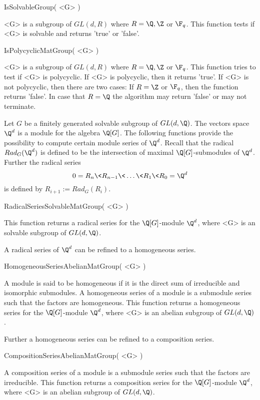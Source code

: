 \> IsSolvableGroup( <G> )

<G> is  a subgroup of $GL(d,R)$ where $R=\Q,\Z $ or $\F_q$.
This function tests if <G> is
solvable and returns 'true' or 'false'. 

\> IsPolycyclicMatGroup( <G> )

<G> is  a subgroup of $GL(d,R)$ where $R=\Q,\Z $ or $\F_q$.
 This function tries to test if <G> is polycyclic. If <G> is polycyclic,
 then it returns 'true'. 
If <G> is not polycyclic, then there are two cases: If $R=\Z$ or $\F_q$,
then the function returns 'false'. In case that $R=\Q$ the algorithm may
return 'false' or may not terminate.
 

Let $G$ be a finitely generated solvable subgroup of $GL(d,\Q)$. The vectors
space $\Q^d$ is a module for the algebra $\Q[G]$. The following
functions provide the possibility to compute certain module series of
$\Q^d$. Recall that the radical $Rad_G(\Q^d)$ is defined to be the
intersection of maximal $\Q[G]$-submodules of $\Q^d$. Further the
radical series 
$$
0=R_n \< R_{n-1} \< \dots \< R_1 \< R_0=\Q^d 
$$
is defined by $R_{i+1}:= Rad_G(R_i)$. 

\> RadicalSeriesSolvableMatGroup( <G> )

This function returns a 
radical series for the $\Q[G]$-module $\Q^d$, where <G> is an
solvable subgroup of $GL(d,\Q)$.

A radical series of $\Q^d$ can be refined to a homogeneous series.

\> HomogeneousSeriesAbelianMatGroup( <G> )

A module is said to be homogeneous if it is the direct sum of
irreducible and isomorphic submodules. A homogeneous series of a module 
is a submodule series such that the factors are homogeneous.
This function returns a 
homogeneous series for the $\Q[G]$-module $\Q^d$, where <G> is an
abelian subgroup of $GL(d,\Q)$.  

Further a homogeneous series can be refined to a composition series.

\> CompositionSeriesAbelianMatGroup( <G> )

A composition series of a module is a submodule series such that 
the factors are irreducible. This function returns a 
composition series for the $\Q[G]$-module $\Q^d$, where <G> is an
abelian subgroup of $GL(d,\Q)$.

